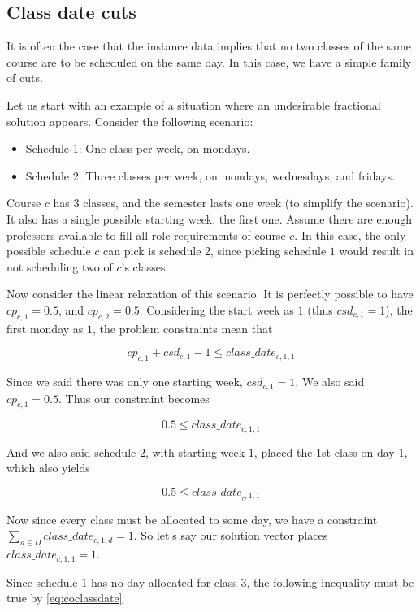 \subsection{Class date cuts}

It is often the case that the instance data implies that no two classes of the same course are to be scheduled on the same day. In this case, we have a simple family of cuts.

Let us start with an example of a situation where an undesirable fractional solution appears. Consider the following scenario:

\begin{itemize}
  \item Schedule 1: One class per week, on mondays.
  \item Schedule 2: Three classes per week, on mondays, wednesdays, and fridays.
\end{itemize}

Course $c$ has 3 classes, and the semester lasts one week (to simplify the scenario). It also has a single possible starting week, the first one. Assume there are enough professors available to fill all role requirements of course $c$. In this case, the only possible schedule $c$ can pick is schedule 2, since picking schedule $1$ would result in not scheduling two of $c$'s classes.

Now consider the linear relaxation of this scenario. It is perfectly possible to have $cp_{c, 1} = 0.5$, and $cp_{c, 2} = 0.5$. Considering the start week as $1$ (thus $csd_{c, 1} = 1$), the first monday as $1$, the problem constraints mean that

$$
cp_{c, 1} + csd_{c, 1} - 1 \le class\_date_{c, 1, 1}
$$

Since we said there was only one starting week, $csd_{c, 1} = 1$. We also said $cp_{c, 1} = 0.5$. Thus our constraint becomes

$$
0.5 \le class\_date_{c, 1, 1}
$$

And we also said schedule $2$, with starting week $1$,  placed the $1$st class on day $1$, which also yields

$$
0.5 \le class\_date_{_c, 1, 1}
$$

Now since every class must be allocated to some day, we have a constraint $\sum_{d \in D} class\_date_{c, 1, d} = 1$. So let's say our solution vector places $class\_date_{c, 1, 1} = 1$.

Since schedule $1$ has no day allocated for class $3$, the following inequality must be true by \ref{eq:coclassdate}

